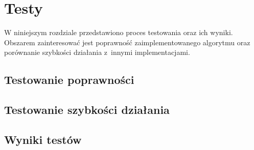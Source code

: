 \chapter{Testy}
\label{cha:testy}

W niniejszym rozdziale przedstawiono proces testowania oraz ich wyniki. Obszarem zainteresować jest poprawność zaimplementowanego algorytmu oraz porównanie szybkości działania z~innymi implementacjami.

\section{Testowanie poprawności}
\label{sec:testPoprawnosc}

\section{Testowanie szybkości działania}
\label{sec:testSzybkosc1}

\section{Wyniki testów}
\label{sec:testWyniki}